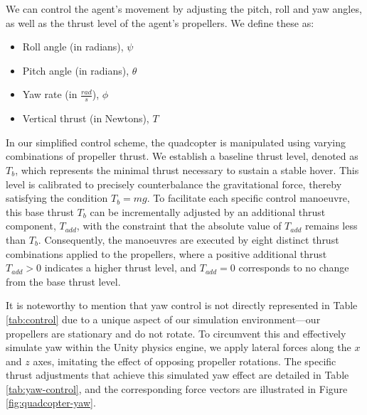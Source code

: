 \documentclass[12pt]{article}
\begin{document}
We can control the agent's movement by adjusting the pitch, roll and yaw angles, as well as the thrust level of the agent's propellers. We define these as:

\begin{itemize}
    \item Roll angle (in radians), $\psi$
    \item Pitch angle (in radians), $\theta$
    \item Yaw rate (in $\frac{rad}{s}$), $\phi$
    \item Vertical thrust (in Newtons), $T$
\end{itemize}

In our simplified control scheme, the quadcopter is manipulated using varying combinations of propeller thrust. We establish a baseline thrust level, denoted as \(T_b\), which represents the minimal thrust necessary to sustain a stable hover. This level is calibrated to precisely counterbalance the gravitational force, thereby satisfying the condition \(T_b = mg\). To facilitate each specific control manoeuvre, this base thrust \(T_b\) can be incrementally adjusted by an additional thrust component, \(T_{add}\), with the constraint that the absolute value of \(T_{add}\) remains less than \(T_b\). Consequently, the manoeuvres are executed by eight distinct thrust combinations applied to the propellers, where a positive additional thrust \(T_{add} > 0\) indicates a higher thrust level, and \(T_{add} = 0\) corresponds to no change from the base thrust level.

It is noteworthy to mention that yaw control is not directly represented in Table \ref{tab:control} due to a unique aspect of our simulation environment—our propellers are stationary and do not rotate. To circumvent this and effectively simulate yaw within the Unity physics engine, we apply lateral forces along the \(x\) and \(z\) axes, imitating the effect of opposing propeller rotations. The specific thrust adjustments that achieve this simulated yaw effect are detailed in Table \ref{tab:yaw-control}, and the corresponding force vectors are illustrated in Figure \ref{fig:quadcopter-yaw}.
\end{document}
